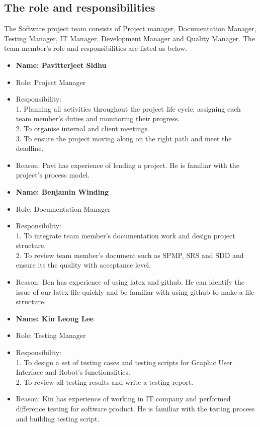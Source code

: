 \subsection{The role and responsibilities}
The Software project team consists of Project manager, Documentation Manager, Testing Manager, IT Manager, Development Manager and Quality Manager. The team member’s role and responsibilities are listed as below.

\begin{itemize}
\item \textbf{Name: Pavitterjeet Sidhu}
\item Role: Project Manager
\item Responsibility: \\
1.	Planning all activities throughout the project life cycle, assigning each team member’s duties and monitoring their progress.\\
2.	To organise internal and client meetings.\\
3.	To ensure the project moving along on the right path and meet the deadline.
\item Reason:
Pavi has experience of lending a project. He is familiar with the project’s process model.
\end{itemize}

\begin{itemize}
\item \textbf{Name: Benjamin Winding}
\item Role: Documentation Manager
\item Responsibility:\\
1.	To integrate team member’s documentation work and design project structure.\\
2.	To review team member’s document such as SPMP, SRS and SDD and ensure its the quality with acceptance level.
\item Reason:
Ben has experience of using latex and github. He can identify the issue of our latex file quickly and be familiar with using github to make a file structure.
\end{itemize}

\begin{itemize}
\item \textbf{Name: Kin Leong Lee}
\item Role: Testing Manager
\item Responsibility:\\
1.	To design a set of testing cases and testing scripts for Graphic User Interface and Robot’s functionalities.\\
2.	To review all testing results and write a testing report.
\item Reason:
Kin has experience of working in IT company and performed difference testing for software product. He is familiar with the testing process and building testing script.
\end{itemize}

